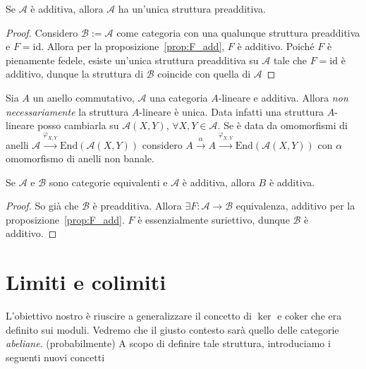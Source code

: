 \begin{corollary}{}
    Se \(\mathcal{A}\) è additiva, allora \(\mathcal{A}\) ha un'unica struttura
    preadditiva.
\end{corollary}
\begin{proof}{}
    Considero \(\mathcal{B} := \mathcal{A}\) come categoria con una qualunque
    struttura preadditiva e \(F = \mathrm{id}\). Allora per la
    proposizione~\ref{prop:F_add}, \(F\) è additivo. Poiché \(F\) è pienamente
    fedele, esiste un'unica struttura preadditiva su \(\mathcal{A}\) tale che \(F=\mathrm{id}\) è additivo, dunque la struttura di \(\mathcal{B}\) coincide con quella di \(\mathcal{A}\) 
\end{proof}
\begin{remark}{}
    Sia \({A}\) un anello commutativo, \(\mathcal{A}\) una categoria
    \(A\)-lineare e additiva. Allora \emph{non necessariamente} la struttura
    \(A\)-lineare è unica. Data infatti una struttura \(A\)-lineare posso
    cambiarla su \(\mathcal{A}{(X, Y)}\), \(\forall X, Y \in \mathcal{A}\). Se è
    data da omomorfismi di anelli \(\mathcal{A} \overset{\varphi_{X,Y} }{\to } \mathrm{End}{(\mathcal{A}{(X, Y)})}\)
    considero \(A \overset{\alpha}{\to } A \overset{\varphi_{X, Y} }{\to } \mathrm{End}{(\mathcal{A}{(X, Y)})}\) con \(\alpha\) omomorfismo di anelli non banale. %
\end{remark}
\begin{corollary}{}
    Se \(\mathcal{A}\) e \(\mathcal{B}\) sono categorie equivalenti e \(\mathcal{A}\) è additiva, allora \(B\) è additiva.
\end{corollary}
\begin{proof}
    So già che \(\mathcal{B}\) è preadditiva. Allora \(\exists F: \mathcal{A} \to \mathcal{B}\) equivalenza, additivo per la proposizione~\ref{prop:F_add}.
    \(F\) è essenzialmente suriettivo, dunque \(\mathcal{B}\) è additivo.
\end{proof}

\section{Limiti e colimiti}

L'obiettivo nostro è riuscire a generalizzare il concetto di \(\ker\) e \(\mathrm{coker}\)
che era definito sui moduli. Vedremo che il giusto contesto sarà quello delle
categorie \emph{abeliane}. (probabilmente) A scopo di definire tale struttura,
introduciamo i seguenti nuovi concetti

